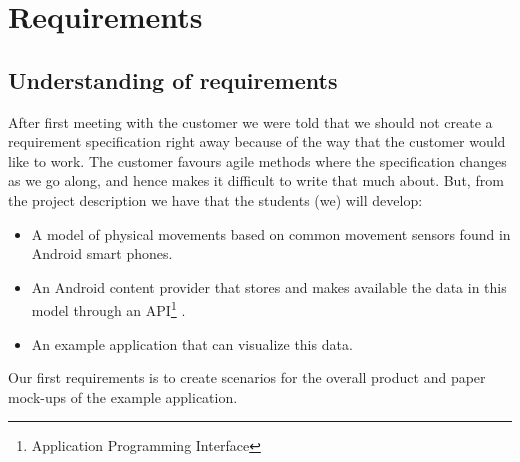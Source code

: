 \chapter{Requirements}
\section{Understanding of requirements}

After first meeting with the customer we were told that we should not create a requirement specification right away because of the way that the customer would like to work. The customer favours agile methods where the specification changes as we go along, and hence makes it difficult to write that much about. But, from the project description we have that the students (we) will develop:
\begin{itemize}
\item A model of physical movements based on common movement sensors found in Android smart phones.
\item An Android content provider that stores and makes available the data in this model through an API\footnote{Application Programming Interface} .
\item An example application that can visualize this data.
\end{itemize}

Our first requirements is to create scenarios for the overall product and paper mock-ups of the example application.
